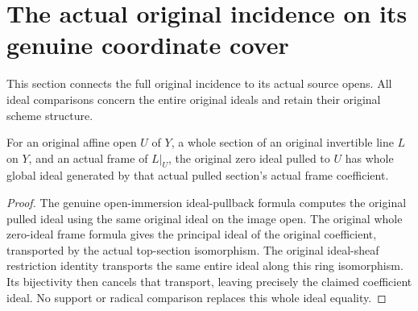 \section{The actual original incidence on its genuine coordinate cover}

This section connects the full original incidence to its actual source
opens. All ideal comparisons concern the entire original ideals and
retain their original scheme structure.

\begin{lemma}
\label{lem:kn-nadel-bertini-open-zero-ideal}
\leanok
{}
For an original affine open $U$ of $Y$, a whole section of an original
invertible line $L$ on $Y$, and an actual frame of $L|_U$, the original
zero ideal pulled to $U$ has whole global ideal generated by that actual
pulled section's actual frame coefficient.
\end{lemma}
\begin{proof}
The genuine open-immersion ideal-pullback formula computes the original
pulled ideal using the same original ideal on the image open. The original
whole zero-ideal frame formula gives the principal ideal of the original
coefficient, transported by the actual top-section isomorphism. The
original ideal-sheaf restriction identity transports the same entire ideal
along this ring isomorphism. Its bijectivity then cancels that transport,
leaving precisely the claimed coefficient ideal. No support or radical
comparison replaces this whole ideal equality.
\end{proof}

